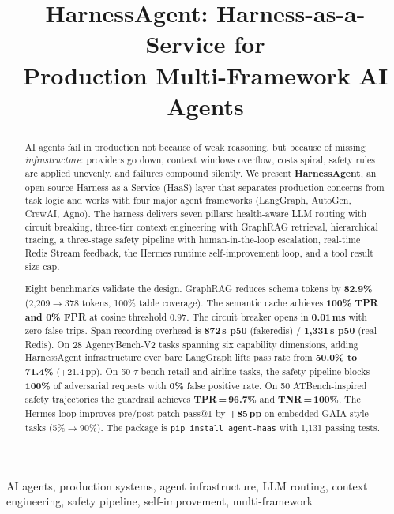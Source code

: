 \documentclass[conference]{IEEEtran}
\begin{document}
\title{HarnessAgent: Harness-as-a-Service for\\Production Multi-Framework AI Agents}

\author{
}

\maketitle

\begin{abstract}
AI agents fail in production not because of weak reasoning, but because
of missing \emph{infrastructure}: providers go down, context windows
overflow, costs spiral, safety rules are applied unevenly, and failures
compound silently. We present \textbf{HarnessAgent}, an open-source
Harness-as-a-Service (HaaS) layer that separates production concerns
from task logic and works with four major agent frameworks (LangGraph,
AutoGen, CrewAI, Agno). The harness delivers seven pillars: health-aware
LLM routing with circuit breaking, three-tier context engineering with
GraphRAG retrieval, hierarchical tracing, a three-stage safety pipeline
with human-in-the-loop escalation, real-time Redis Stream feedback, the
Hermes runtime self-improvement loop, and a tool result size cap.

Eight benchmarks validate the design. GraphRAG reduces schema tokens by
\textbf{82.9\%} (2,209$\to$378 tokens, 100\% table coverage). The
semantic cache achieves \textbf{100\% TPR and 0\% FPR} at cosine
threshold 0.97. The circuit breaker opens in \textbf{0.01\,ms} with
zero false trips. Span recording overhead is \textbf{872\,\textmu{}s
p50} (fakeredis) / \textbf{1,331\,\textmu{}s p50} (real Redis).
On 28 AgencyBench-V2 tasks spanning six capability dimensions, adding
HarnessAgent infrastructure over bare LangGraph lifts pass rate from
\textbf{50.0\% to 71.4\%} (+21.4\,pp). On 50 $\tau$-bench retail and
airline tasks, the safety pipeline blocks \textbf{100\%} of adversarial
requests with \textbf{0\%} false positive rate. On 50 ATBench-inspired
safety trajectories the guardrail achieves \textbf{TPR\,=\,96.7\%} and
\textbf{TNR\,=\,100\%}. The Hermes loop improves pre/post-patch pass@1
by \textbf{+85\,pp} on embedded GAIA-style tasks (5\%$\to$90\%).
The package is \texttt{pip install agent-haas} with 1,131 passing tests.
\end{abstract}

\begin{IEEEkeywords}
AI agents, production systems, agent infrastructure, LLM routing,
context engineering, safety pipeline, self-improvement, multi-framework
\end{IEEEkeywords}
\end{document}
